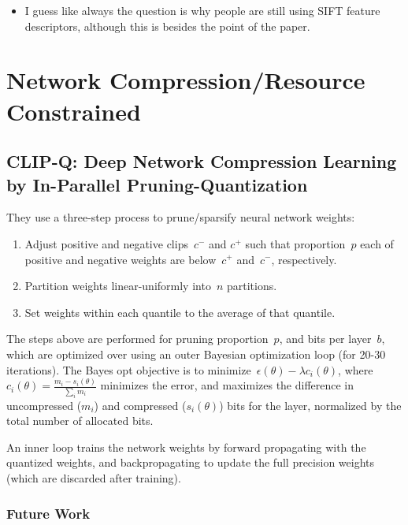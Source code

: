 \documentclass[a4paper, 12pt]{article}
\begin{document}
\begin{itemize}
        \item I guess like always the question is why people are still using
                SIFT feature descriptors, although this is besides the point of
                the paper.
\end{itemize}


\section{Network Compression/Resource Constrained}

\subsection{CLIP-Q: Deep Network Compression Learning by In-Parallel
            Pruning-Quantization~\cite{Tung_2018_CVPR}}

They use a three-step process to prune/sparsify neural network weights:

\begin{enumerate}
        \item Adjust positive and negative clips~$c^-$ and $c^+$ such that
                proportion~$p$ each of positive and negative weights are
                below~$c^+$ and~$c^-$, respectively.

        \item Partition weights linear-uniformly into~$n$ partitions.

        \item Set weights within each quantile to the average of that quantile.
\end{enumerate}

The steps above are performed for pruning proportion~$p$, and bits per
layer~$b$, which are optimized over using an outer Bayesian optimization loop
(for 20-30 iterations). The Bayes opt objective is to
minimize~$\epsilon(\theta) - \lambda c_i(\theta)$,
where~$c_i(\theta) = \frac{m_i - s_i(\theta)}{\sum_i m_i}$ minimizes the error,
and maximizes the difference in uncompressed ($m_i$) and compressed
($s_i(\theta)$) bits for the layer, normalized by the total number of allocated
bits.

An inner loop trains the network weights by forward propagating with the
quantized weights, and backpropagating to update the full precision weights
(which are discarded after training).


\subsubsection{Future Work}
\end{document}
